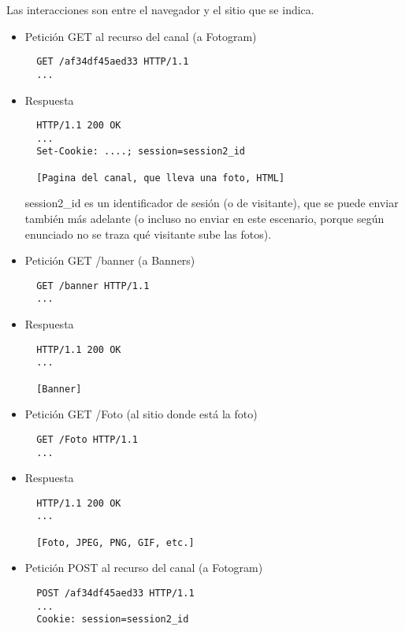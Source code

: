 Las interacciones son entre el navegador y el sitio que se indica.

\begin{itemize}
\item Petición GET al recurso del canal (a Fotogram)

\begin{verbatim}
  GET /af34df45aed33 HTTP/1.1
  ...
\end{verbatim}

\item Respuesta

\begin{verbatim}
  HTTP/1.1 200 OK
  ...
  Set-Cookie: ....; session=session2_id

  [Pagina del canal, que lleva una foto, HTML]
\end{verbatim}

session2\_id es un identificador de sesión (o de visitante), que se puede enviar también más adelante (o incluso no enviar en este escenario, porque según enunciado no se traza qué visitante sube las fotos).

\item Petición GET /banner (a Banners)

\begin{verbatim}
  GET /banner HTTP/1.1
  ...
\end{verbatim}

\item Respuesta

\begin{verbatim}
  HTTP/1.1 200 OK
  ...

  [Banner]
\end{verbatim}

\item Petición GET /Foto (al sitio donde está la foto)

\begin{verbatim}
  GET /Foto HTTP/1.1
  ...
\end{verbatim}

\item Respuesta

\begin{verbatim}
  HTTP/1.1 200 OK
  ...

  [Foto, JPEG, PNG, GIF, etc.]
\end{verbatim}


\item Petición POST al recurso del canal (a Fotogram)

\begin{verbatim}
  POST /af34df45aed33 HTTP/1.1
  ...
  Cookie: session=session2_id


\end{verbatim}
\end{itemize}
